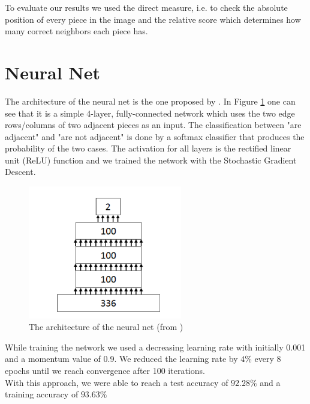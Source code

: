 \documentclass[11pt]{report}
\begin{document}
To evaluate our results we used the direct measure, i.e. to check the absolute position of every piece in the image and the relative score which determines how many correct neighbors each piece has.
\newpage

\section{Neural Net}
The architecture of the neural net is the one proposed by \cite{sholomon2016dnn}. In Figure \ref{fig:NN} one can see that it is a simple 4-layer, fully-connected network which uses the two edge rows/columns of two adjacent pieces as an input. The classification between "are adjacent" and "are not adjacent" is done by a softmax classifier that produces the probability of the two cases. The activation for all layers is the rectified linear unit (ReLU) function and we trained the network with the Stochastic Gradient Descent.
\begin{figure}[ht]
	\centering
	\includegraphics[width=0.6\textwidth]{NeuralNet.PNG}
	
	\caption{The architecture of the neural net (from \cite{sholomon2016dnn})}
	\label{fig:NN}
\end{figure}
While training the network we used a decreasing learning rate with initially 0.001 and a momentum value of 0.9. We reduced the learning rate by $4\%$ every 8 epochs until we reach convergence after 100 iterations. \\
With this approach, we were able to reach a test accuracy of $92.28\%$ and a training accuracy of $93.63\%$
\end{document}

